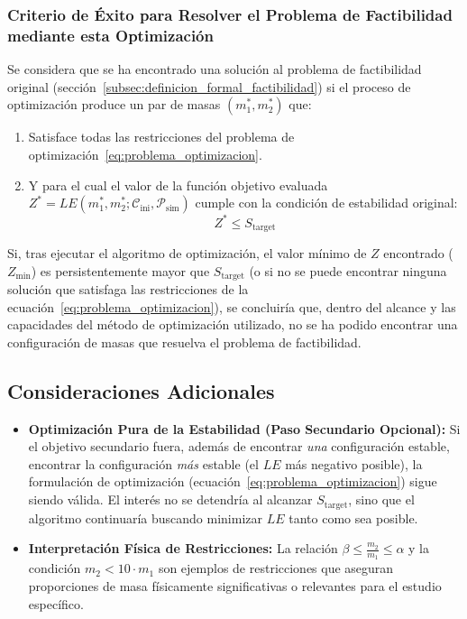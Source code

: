 \subsubsection{Criterio de Éxito para Resolver el Problema de Factibilidad mediante esta Optimización}%
\label{ssubsec:criterio_exito_opt}
Se considera que se ha encontrado una solución al problema de factibilidad original (sección~\ref{subsec:definicion_formal_factibilidad}) si el proceso de optimización produce un par de masas $(m_1^*, m_2^*)$ que:
\begin{enumerate}
    \item Satisface todas las restricciones del problema de optimización~\eqref{eq:problema_optimizacion}.
    \item Y para el cual el valor de la función objetivo evaluada $Z^* = LE(m_1^*, m_2^*; \mathcal{C}_{\text{ini}}, \mathcal{P}_{\text{sim}})$ cumple con la condición de estabilidad original:
    \begin{equation}
        Z^* \leq S_{\text{target}}
    \end{equation}
\end{enumerate}
Si, tras ejecutar el algoritmo de optimización, el valor mínimo de $Z$ encontrado ($Z_{\text{min}}$) es persistentemente mayor que $S_{\text{target}}$ (o si no se puede encontrar ninguna solución que satisfaga las restricciones de la ecuación~\eqref{eq:problema_optimizacion}), se concluiría que, dentro del alcance y las capacidades del método de optimización utilizado, no se ha podido encontrar una configuración de masas que resuelva el problema de factibilidad.

\subsection{Consideraciones Adicionales}%
\label{subsec:consideraciones_adicionales}

\begin{itemize}
    \item \textbf{Optimización Pura de la Estabilidad (Paso Secundario Opcional):}
    Si el objetivo secundario fuera, además de encontrar \textit{una} configuración estable, encontrar la configuración \textit{más} estable (el $LE$ más negativo posible), la formulación de optimización (ecuación~\eqref{eq:problema_optimizacion}) sigue siendo válida. El interés no se detendría al alcanzar $S_{\text{target}}$, sino que el algoritmo continuaría buscando minimizar $LE$ tanto como sea posible.
    \item \textbf{Interpretación Física de Restricciones:} La relación $\beta \leq \frac{m_2}{m_1} \leq \alpha$ y la condición $m_2 < 10 \cdot m_1$ son ejemplos de restricciones que aseguran proporciones de masa físicamente significativas o relevantes para el estudio específico.
\end{itemize}